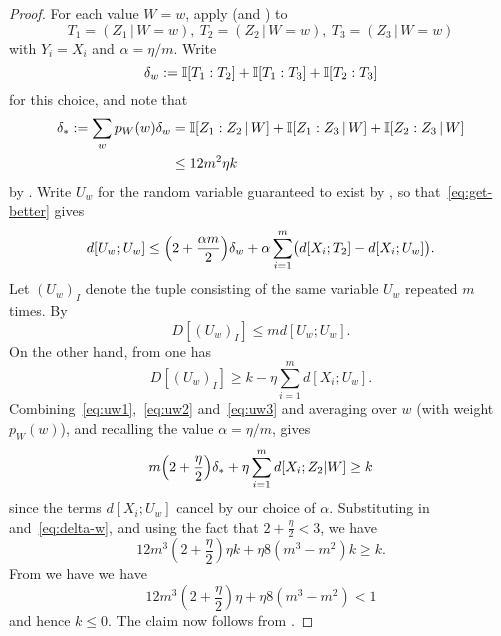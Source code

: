 \begin{proof} For each value $W=w$, apply  (and ) to
  \[
    T_1 = (Z_1 \,|\, W \mathop{=} w),\
    T_2 = (Z_2 \,|\, W \mathop{=} w),\
    T_3 = (Z_3 \,|\, W \mathop{=} w)
  \]
  with $Y_i=X_i$ and $\alpha=\eta/m$.  Write
  \[
    \delta_w :=  \mathbb{I}[T_1 : T_2] + \mathbb{I}[T_1 : T_3] + \mathbb{I}[T_2 : T_3]
  \]
  for this choice, and note that
  \begin{align}
    \label{eq:delta-w}
    \nonumber
    \delta_\ast := \sum_w p_W(w) \delta_w &= \mathbb{I}[Z_1 : Z_2 \,|\, W] + \mathbb{I}[Z_1 : Z_3 \,|\, W] + \mathbb{I}[Z_2 : Z_3 \,|\, W] \\
                           & \leq 12 m^2 \eta k
  \end{align}
  by .
  Write $U_w$ for the random variable guaranteed to exist by ,
  so that~\eqref{eq:get-better} gives \begin{equation}
    \label{eq:uw1}
    d[U_w; U_w] \leq \Bigl( 2 + \frac{\alpha m}{2} \Bigr) \delta_w + \alpha \sum_{i=1}^m \bigl( d[X_i; T_2] - d[X_i; U_w] \bigr).
  \end{equation}
  Let $(U_w)_I$ denote the tuple consisting of the same variable $U_w$ repeated $m$ times.
  By 
  \begin{equation}
    \label{eq:uw2}
    D[(U_w)_I] \leq m d[U_w; U_w].
  \end{equation}
  On the other hand, from  one has
  \begin{equation}
    \label{eq:uw3}
    D[(U_w)_I] \geq k - \eta \sum_{i=1}^m d[X_i;U_w].
  \end{equation}
  Combining~\eqref{eq:uw1},~\eqref{eq:uw2} and~\eqref{eq:uw3} and averaging over $w$ (with weight $p_W(w)$), and recalling the value $\alpha=\eta/m$, gives
  \[
     m \Bigl( 2 + \frac{\eta}{2} \Bigr) \delta_\ast + \eta \sum_{i=1}^m d[X_i; Z_2 | W]
    \geq k
  \]
  since the terms $d[X_i; U_w]$ cancel by our choice of $\alpha$.
  Substituting in  and~\eqref{eq:delta-w}, and using the fact that $2 + \frac{\eta}{2} < 3$, we have
  \[
    12 m^3 (2+\frac{\eta}{2}) \eta k + \eta 8(m^3-m^2) k \geq k.
  \]
  From \Cref{eta-def-multi} we have we have
  $$ 12 m^3 (2+\frac{\eta}{2}) \eta + \eta 8(m^3-m^2) < 1$$
  and hence $k \leq 0$.  The claim now follows from .
\end{proof}

